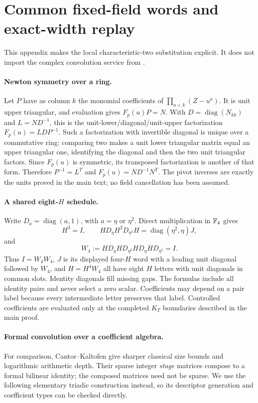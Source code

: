 \section{Common fixed-field words and exact-width replay}

This appendix makes the local characteristic-two substitution explicit.
It does not import the complex convolution service from \cite{local}.

\paragraph{Newton symmetry over a ring.}
Let $P$ have as column $k$ the monomial coefficients of
$\prod_{a<k}(Z-u^a)$. It is unit upper triangular, and evaluation
gives $F_p(u)P=N$. With $D=\operatorname{diag}(N_{kk})$ and
$L=ND^{-1}$, this is the unit-lower/diagonal/unit-upper factorization
$F_p(u)=LDP^{-1}$. Such a factorization with invertible diagonal is
unique over a commutative ring: comparing two makes a unit lower
triangular matrix equal an upper triangular one, identifying the
diagonal and then the two unit triangular factors. Since $F_p(u)$ is
symmetric, its transposed factorization is another of that form.
Therefore $P^{-1}=L^T$ and $F_p(u)=ND^{-1}N^T$. The pivot inverses
are exactly the units proved in the main text; no field cancellation
has been assumed.

\paragraph{A shared eight-$H$ schedule.}
Write $D_a=\operatorname{diag}(a,1)$, with $a=\eta$ or $\eta^2$.
Direct multiplication in $\mathbb F_4$ gives
\[
 H^3=I,\qquad
 H D_\eta H^2 D_{\eta^2}H
   =\operatorname{diag}(\eta^2,\eta)J,
\]
and
\[
 W_4:=H D_\eta H D_{\eta^2}H D_\eta H D_{\eta^2}=I.
\]
Thus $I=W_4W_4$, $J$ is its displayed four-$H$ word with a leading
unit diagonal followed by $W_4$, and $H=H^4W_4$ all have eight $H$
letters with unit diagonals in common slots. Identity diagonals fill
missing gaps. The formulas include all identity pairs and never
select a zero scalar. Coefficients may depend on a pair label because
every intermediate letter preserves that label. Controlled
coefficients are evaluated only at the completed $K_T$ boundaries
described in the main proof.

\paragraph{Formal convolution over a coefficient algebra.}
For comparison, Cantor--Kaltofen \cite{cantor-kaltofen} give sharper
classical size bounds and logarithmic arithmetic depth. Their sparse
integer \emph{stage} matrices compose to a formal bilinear identity;
the composed matrices need not be sparse. We use the following
elementary triadic construction instead, so its descriptor generation
and coefficient types can be checked directly.

